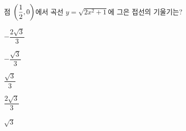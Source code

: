 점 $\left(\dfrac{1}{2}{,}\mkern3mu\mathopen{}0\right)$에서 곡선 $y=\sqrt{2x^2+1}$에 그은 접선의 기울기는?
\begin{choices32}{\rule[-3ex]{0pt}{8ex}$-\dfrac{2\sqrt{3}}{3}$}{\rule[-3ex]{0pt}{8ex}$-\dfrac{\sqrt{3}}{3}$}{\rule[-3ex]{0pt}{8ex}$\dfrac{\sqrt{3}}{3}$}{\rule[-3ex]{0pt}{8ex}$\dfrac{2\sqrt{3}}{3}$}{\rule[-3ex]{0pt}{8ex}$\sqrt{3}$}\end{choices32}
